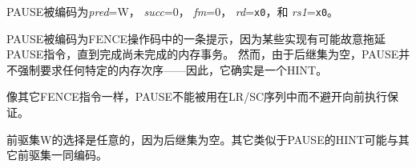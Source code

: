 PAUSE被编码为{\em pred}=W， {\em succ}=0， {\em fm}=0， {\em rd}={\tt x0}，和 {\em rs1}={\tt x0}。

\begin{commentary}
PAUSE被编码为FENCE操作码中的一条提示，因为某些实现有可能故意拖延PAUSE指令，直到完成尚未完成的内存事务。
然而，由于后继集为空，PAUSE并不强制要求任何特定的内存次序——因此，它确实是一个HINT。

像其它FENCE指令一样，PAUSE不能被用在LR/SC序列中而不避开向前执行保证。

前驱集W的选择是任意的，因为后继集为空。其它类似于PAUSE的HINT可能与其它前驱集一同编码。
\end{commentary}
